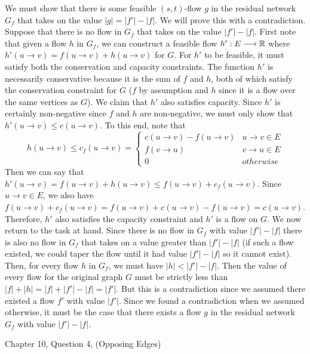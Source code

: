 \documentclass{article}
\begin{document}
We must show that there is some feasible $(s,t)$-flow $g$ in the residual network $G_f$ that takes on the value $|g| = |f'| - |f|$.
We will prove this with a contradiction.
Suppose that there is no flow in $G_f$ that takes on the value $|f'| - |f|$. \parspace
First note that given a flow $h$ in $G_f$, we can construct a feasible flow $h': E \longrightarrow {\mathbb R}$ where $h'(u \to v) = f(u \to v) + h(u \to v)$ for $G$.
For $h'$ to be feasible, it must satisfy both the conservation and capacity constraints.
The function $h'$ is necessarily conservative because it is the sum of $f$ and $h$, both of which satisfy the conservation constraint for $G$ ($f$ by assumption and $h$ since it is a flow over the same vertices as $G$).
We claim that $h'$ also satisfies capacity.
Since $h'$ is certainly non-negative since $f$ and $h$ are non-negative, we must only show that $h'(u \to v) \leq c(u \to v)$.
To this end, note that
$$ h(u \to v) \leq c_f (u \to v) =
\begin{cases}
    c(u \to v) - f(u \to v)  & u \to v \in E \\
    f(v \to u)               & v \to u \in E \\
    0                        & otherwise
\end{cases} $$
Then we can say that $h'(u \to v) = f(u \to v) + h(u \to v) \leq f(u \to v) + c_f (u \to v)$.
Since $u \to v \in E$, we also have $f(u \to v) + c_f (u \to v) = f(u \to v) + c(u \to v) - f(u \to v) = c(u \to v)$.
Therefore, $h'$ also satisfies the capacity constraint and $h'$ is a flow on $G$. \parspace
We now return to the task at hand.
Since there is no flow in $G_f$ with value $|f'| - |f|$ there is also no flow in $G_f$ that takes on a value greater than $|f'| - |f|$ (if such a flow existed, we could taper the flow until it had value $|f'| - |f|$ so it cannot exist).
Then, for every flow $h$ in $G_f$, we must have $|h| < |f'| - |f|$.
Then the value of every flow for the original graph $G$ must be strictly less than $|f| + |h| = |f| + |f'| - |f| = |f'|$.
But this is a contradiction since we assumed there existed a flow $f'$ with value $|f'|$.
Since we found a contradiction when we assumed otherwise, it must be the case that there exists a flow $g$ in the residual network $G_f$ with value $|f'| - |f|$.



\nextprob
{}

Chapter 10, Question 4, (Opposing Edges)
\end{document}
